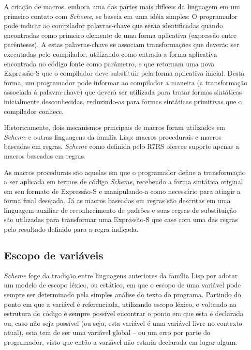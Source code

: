 A criação de macros, embora uma das partes mais difíceis da linguagem em um
primeiro contato com \textit{Scheme}, se baseia em uma idéia simples: O
programador pode indicar ao compilador palavras-chave que serão identificadas
quando encontradas como primeiro elemento de uma forma aplicativa (expressão
entre parênteses).  A estas palavras-chave se associam transformações que
deverão ser executadas pelo compilador, utilizando como entrada a forma
aplicativa encontrada no código fonte como parâmetro, e que retornam uma nova
Expressão-S que o compilador deve substituir pela forma aplicativa inicial.
Desta forma, um programador pode informar ao compilador a maneira (a
transformação associada à palavra-chave) que deverá ser utilizada para tratar
formas sintáticas inicialmente desconhecidas, reduzindo-as para formas
sintáticas primitivas que o compilador conhece.

Historicamente, dois mecanismos principais de macros foram utilizados em
\textit{Scheme} e outras linguagens da família Lisp: macros procedurais e
macros baseadas em regras. \textit{Scheme} como definida pelo \acs{R7RS}
oferece suporte apenas a macros baseadas em regras.

As macros procedurais são aquelas em que o programador define a transformação a
ser aplicada em termos de código \textit{Scheme}, recebendo a forma sintática
original em seu formato de Expressão-S e manipulando-a como necessário para
atingir a forma final desejada. Já as macros baseadas em regras são descritas
em uma linguagem auxiliar de reconhecimento de padrões e suas regras de
substituição são utilizadas para transformar uma Expressão-S que case com uma
das regras pelo resultado definido para a regra indicada. 

\subsection{Escopo de variáveis}

\textit{Scheme} foge da tradição entre linguagens anteriores da família Lisp
por adotar um modelo de escopo léxico, ou estático, em que o escopo de uma
variável pode sempre ser determinado pela simples análise do texto do programa.
Partindo do ponto em que a variável é referenciada, utilizando escopo léxico, e
voltando na estrutura do código é sempre possível encontrar o ponto em que esta
é declarada ou, caso não seja possível (ou seja, esta variável é uma variável
livre no contexto atual), esta tem de ser uma variável global -- ou um erro por
parte do programador, visto que então a variável não estaria declarada em lugar
algum.

